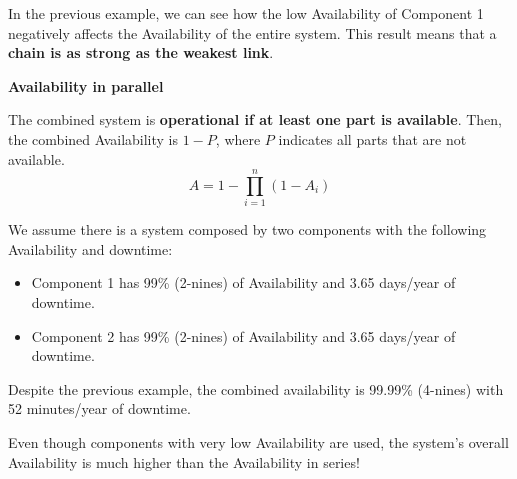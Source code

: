 \highspace
In the previous example, we can see how the low Availability of Component 1 negatively affects the Availability of the entire system. This result means that a \textbf{chain is as strong as the weakest link}.

\newpage

\begin{flushleft}
    \textcolor{Red2}{ \textbf{Availability in parallel}}
\end{flushleft}
The combined system is \textbf{operational if at least one part is available}. Then, the combined Availability is $1-P$, where $P$ indicates all parts that are not available.
\begin{equation}\label{eq: availability in parallel}
    A = 1 - \displaystyle\prod_{i=1}^{n}\left(1-A_{i}\right)
\end{equation}

\begin{examplebox}
    We assume there is a system composed by two components with the following Availability and downtime:
    \begin{itemize}
        \item Component 1 has 99\% (2-nines) of Availability and 3.65 days/year of downtime.
        \item Component 2 has 99\% (2-nines) of Availability and 3.65 days/year of downtime.
    \end{itemize}
    Despite the previous example, the combined availability is 99.99\% (4-nines) with 52 minutes/year of downtime.
\end{examplebox}

\noindent
Even though components with very low Availability are used, the system's overall Availability is much higher than the Availability in series!

